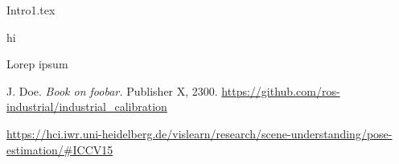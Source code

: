 \documentclass{ctuthesis}
\begin{document}
\maketitle
{Intro1.tex}


hi \cite{2}




Lorep ipsum \cite{doe}



\begin{thebibliography}{1}

 J. Doe. \emph{Book on foobar.} Publisher X,
2300.
\url{https://github.com/ros-industrial/industrial_calibration}

\url{https://hci.iwr.uni-heidelberg.de/vislearn/research/scene-understanding/pose-estimation/#ICCV15}
\end{thebibliography}
\end{document}
